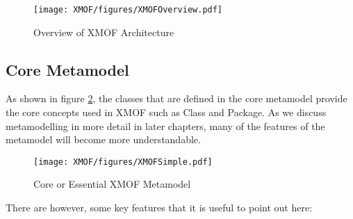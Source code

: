 \begin{figure}[htb]
\begin{center}
\texttt{[image: XMOF/figures/XMOFOverview.pdf]}
\caption{Overview of XMOF Architecture} \label{xmofOverview}
\end{center}
\end{figure}

\subsection{Core Metamodel}

As shown in figure \ref{coreMetamodel}, the classes that are
defined in the core metamodel provide the core concepts used in
XMOF such as Class and Package. As we discuss metamodelling in
more detail in later chapters, many of the features of the
metamodel will become more understandable.

\begin{figure}[htb]
\begin{center}
\texttt{[image: XMOF/figures/XMOFSimple.pdf]}
\caption{Core or Essential XMOF Metamodel} \label{coreMetamodel}
\end{center}
\end{figure}

\noindent There are however, some key features that it is useful
to point out here:

